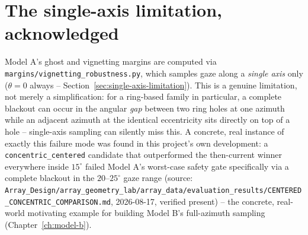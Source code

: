 \section{The single-axis limitation, acknowledged}
\label{sec:model-a-limitation}
Model A's ghost and vignetting margins are computed via
\texttt{margins/vignetting\_robustness.py}, which samples gaze along a \emph{single
axis} only ($\theta=0$ always -- Section~\ref{sec:single-axis-limitation}). This is a
genuine limitation, not merely a simplification: for a ring-based family in particular,
a complete blackout can occur in the angular \emph{gap} between two ring holes at one
azimuth while an adjacent azimuth at the identical eccentricity sits directly on top of
a hole -- single-axis sampling can silently miss this. A concrete, real instance of
exactly this failure mode was found in this project's own development: a
\texttt{concentric\_centered} candidate that outperformed the then-current winner
everywhere inside $15^\circ$ failed Model A's worst-case safety gate specifically via a
complete blackout in the $20$--$25^\circ$ gaze range (source:
\texttt{Array\_Design/array\_geometry\_lab/array\_data/evaluation\_results/CENTERED\_CONCENTRIC\_COMPARISON.md},
2026-08-17, verified present) -- the concrete, real-world motivating example for
building Model B's full-azimuth sampling (Chapter~\ref{ch:model-b}).

